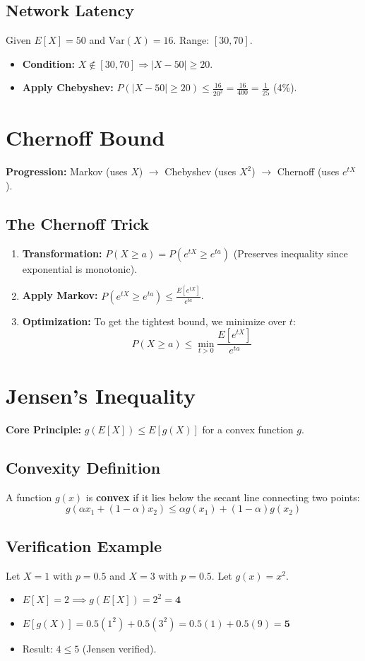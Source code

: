 \documentclass[11pt]{article}
\begin{document}
\subsection{Network Latency}
Given $E[X] = 50$ and $\text{Var}(X) = 16$. Range: $[30, 70]$.
\begin{itemize}
    \item \textbf{Condition:} $X \notin [30,70] \Rightarrow |X - 50| \ge 20$.
    \item \textbf{Apply Chebyshev:} $P(|X - 50| \ge 20) \le \frac{16}{20^2} = \frac{16}{400} = \frac{1}{25}$ (4\%).
\end{itemize}

\section{Chernoff Bound}
\textbf{Progression:} Markov (uses $X$) $\to$ Chebyshev (uses $X^2$) $\to$ Chernoff (uses $e^{tX}$).

\subsection{The Chernoff Trick}
\begin{enumerate}
    \item \textbf{Transformation:} $P(X \ge a) = P(e^{tX} \ge e^{ta})$ (Preserves inequality since exponential is monotonic).
    \item \textbf{Apply Markov:} $P(e^{tX} \ge e^{ta}) \le \frac{E[e^{tX}]}{e^{ta}}$.
    \item \textbf{Optimization:} To get the tightest bound, we minimize over $t$:
    \[ P(X \ge a) \le \min_{t > 0} \frac{E[e^{tX}]}{e^{ta}} \]
\end{enumerate}

\section{Jensen’s Inequality}
\textbf{Core Principle:} $g(E[X]) \le E[g(X)]$ for a convex function $g$.

\subsection{Convexity Definition}
A function $g(x)$ is \textbf{convex} if it lies below the secant line connecting two points:
\[ g(\alpha x_1 + (1-\alpha)x_2) \le \alpha g(x_1) + (1-\alpha) g(x_2) \]

\subsection{Verification Example}
Let $X = 1$ with $p=0.5$ and $X = 3$ with $p=0.5$. Let $g(x) = x^2$.
\begin{itemize}
    \item $E[X] = 2 \implies g(E[X]) = 2^2 = \mathbf{4}$
    \item $E[g(X)] = 0.5(1^2) + 0.5(3^2) = 0.5(1) + 0.5(9) = \mathbf{5}$
    \item Result: $4 \le 5$ (\checkmark Jensen verified).
\end{itemize}
\end{document}
